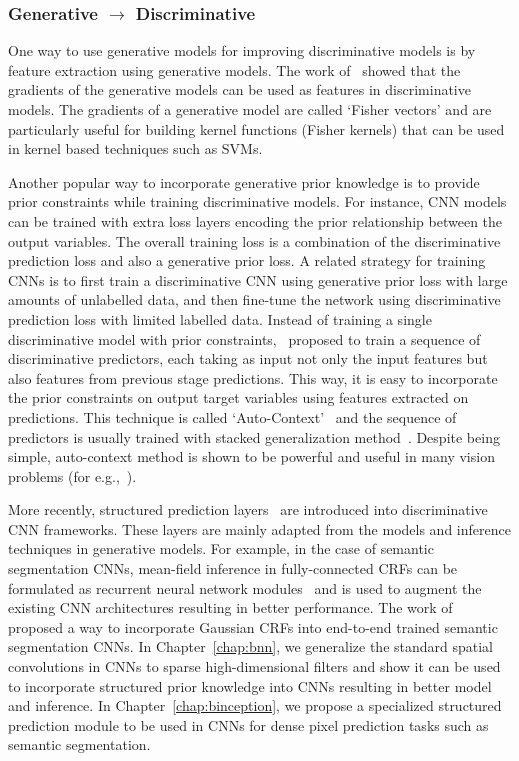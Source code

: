 \subsubsection{Generative $\rightarrow $ Discriminative}

One way to use generative models for improving discriminative models is by
feature extraction using generative models. The work of~\cite{jaakkola1999exploiting} showed that
the gradients of the generative models
can be used as features in discriminative models.
The gradients of a generative model are called `Fisher vectors' and are
particularly useful for building kernel functions (Fisher kernels)
that can be used in kernel based techniques such as SVMs.

Another popular way to incorporate generative prior knowledge
is to provide prior constraints while training discriminative models.
For instance, CNN models can be trained
with extra loss layers encoding the prior relationship between the output
variables. The overall training loss is a combination
of the discriminative prediction loss and also a generative prior loss.
A related strategy for training CNNs is to first train a discriminative CNN
using generative prior loss with large amounts of unlabelled data,
and then fine-tune the network using discriminative prediction loss with
limited labelled data. Instead of training a single discriminative
model with prior constraints,~\cite{tu2010auto} proposed to train a sequence of
discriminative predictors, each taking as input not only the input features
but also features from previous stage predictions. This way, it is easy to
incorporate the prior constraints on output target variables using features
extracted on predictions. This technique is called `Auto-Context'~\cite{tu2010auto} and
the sequence of predictors is usually trained with stacked generalization
method~\cite{wolpert1992stacked}. Despite being simple, auto-context method
is shown to be powerful and useful in many vision problems
(for e.g.,~\cite{tu2010auto,jiang2009efficient,jampani15wacv}).

More recently, structured prediction layers~\cite{ionescu2015matrix,zheng2015conditional,schwing2015fully,chandra2016fast}
are introduced into
discriminative CNN frameworks. These layers are mainly adapted from the models and inference
techniques in generative models. For example, in the case of semantic segmentation
CNNs, mean-field inference in fully-connected CRFs can be formulated as
recurrent neural network modules~\cite{domke2013learning,zheng2015conditional}
and is used to augment the existing
CNN architectures resulting in better performance. The work of~\cite{chandra2016fast}
proposed a way to incorporate Gaussian CRFs into end-to-end trained semantic
segmentation CNNs. In Chapter~\ref{chap:bnn}, we generalize the standard spatial convolutions
in CNNs to sparse high-dimensional filters and show it can be used to incorporate
structured prior knowledge into CNNs resulting in better model and inference.
In Chapter~\ref{chap:binception}, we propose a specialized structured prediction
module to be used in CNNs for dense pixel prediction tasks such as semantic
segmentation.

